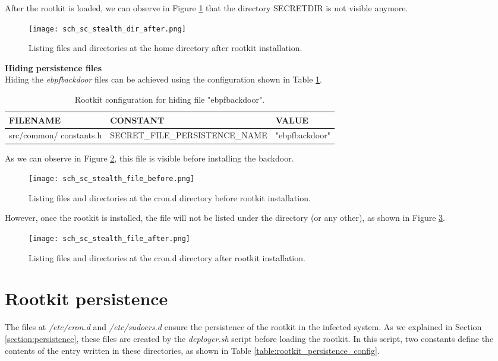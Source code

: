 After the rootkit is loaded, we can observe in Figure \ref{fig:sc_stealth_dir_after} that the directory SECRETDIR is not visible anymore.

\begin{figure}[htbp]
	\centering
	\texttt{[image: sch\_sc\_stealth\_dir\_after.png]}
	\caption{Listing files and directories at the home directory after rootkit installation.}
	\label{fig:sc_stealth_dir_after}
\end{figure}

\textbf{Hiding persistence files}\\
Hiding the \textit{ebpfbackdoor} files can be achieved using the configuration shown in Table \ref{table:rootkit_stealth_config_file}.

\begin{table}[htbp]
\begin{tabular}{|>{\centering\arraybackslash}p{3cm}|>{\centering\arraybackslash}p{4.5cm}|>{\centering\arraybackslash}p{6cm}|}
\hline
\textbf{FILENAME} & \textbf{CONSTANT} & \textbf{VALUE}\\
\hline
\hline
src/common/ constants.h & SECRET\_FILE\_PERSISTENCE\_NAME & "ebpfbackdoor"\\
\hline
\end{tabular}
\caption{Rootkit configuration for hiding file "ebpfbackdoor".}
\label{table:rootkit_stealth_config_file}
\end{table}

As we can observe in Figure \ref{fig:sc_stealth_file_before}, this file is visible before installing the backdoor.

\begin{figure}[htbp]
	\centering
	\texttt{[image: sch\_sc\_stealth\_file\_before.png]}
	\caption{Listing files and directories at the cron.d directory before rootkit installation.}
	\label{fig:sc_stealth_file_before}
\end{figure}

However, once the rootkit is installed, the file will not be listed under the directory (or any other), as shown in Figure \ref{fig:sc_stealth_file_after}.

\begin{figure}[htbp]
	\centering
	\texttt{[image: sch\_sc\_stealth\_file\_after.png]}
	\caption{Listing files and directories at the cron.d directory after rootkit installation.}
	\label{fig:sc_stealth_file_after}
\end{figure}


\section{Rootkit persistence}
The files at \textit{/etc/cron.d} and \textit{/etc/sudoers.d} ensure the persistence of the rootkit in the infected system. As we explained in Section \ref{section:persistence}, these files are created by the \textit{deployer.sh} script before loading the rootkit. In this script, two constants define the contents of the entry written in these directories, as shown in Table \ref{table:rootkit_persistence_config}.

